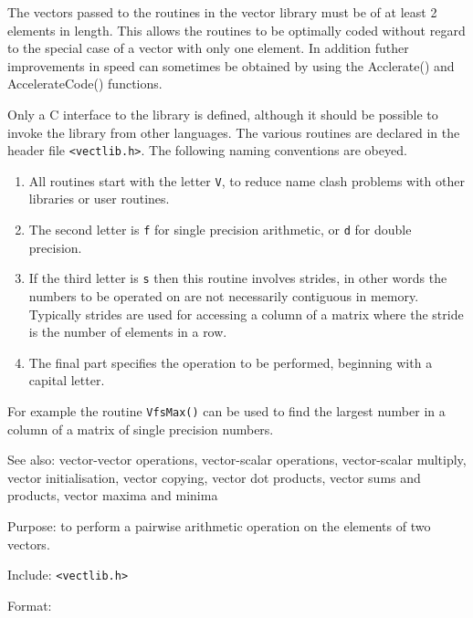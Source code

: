 The vectors passed to the routines in the vector library must be of at
least 2 elements in length.  This allows the routines to be optimally
coded without regard to the special case of a vector with only one element.
In addition futher improvements in speed can sometimes be obtained by
using the Acclerate() and AccelerateCode() functions.

Only a C interface to the library is defined, although it should be possible
to invoke the library from other languages. The various routines are
declared in the header file \verb+<vectlib.h>+. The following naming
conventions are obeyed.

\begin{enumerate}
\item All routines start with the letter {\tt V}, to reduce name clash problems
with other libraries or user routines.
\item The second letter is {\tt f} for single precision arithmetic, or
{\tt d} for double precision.
\item If the third letter is {\tt s} then this routine involves strides,
in other words the numbers to be operated on are not 
necessarily contiguous in memory.
Typically strides are used for accessing a column of a matrix where the
stride is the number of elements in a row.
\item The final part specifies the operation to be performed, beginning
with a capital letter.
\end{enumerate}

For example the routine {\tt VfsMax()} can be used to find the
largest number in a column of a matrix of single precision numbers.

See also: vector-vector operations, vector-scalar operations,
vector-scalar multiply, vector initialisation, vector copying, vector
dot products, vector sums and products, vector maxima and minima

Purpose: to perform a pairwise arithmetic operation on the elements of two
vectors.

Include: \verb+<vectlib.h>+

Format:

